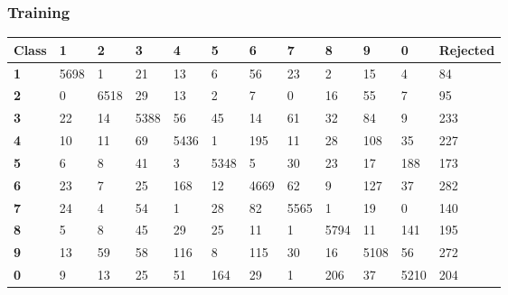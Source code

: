 \documentclass[
  a4paper,            %
  DIV=10,             %
  oneside,            %
  BCOR=5mm,           %
  parskip=half,       %
  numbers=noenddot,   %
  bibtotoc,           %
  listof=totoc,        %
  article
]{scrreprt}
\begin{document}
\subsubsection{Training}
\begin{center}
  \begin{tabular}{|p{1cm}|p{1cm}|p{1cm}|p{1cm}|p{1cm}|p{1cm}|p{1cm}|p{1cm}|p{1cm}|p{1cm}|p{1cm}|p{1.7cm}|}
    \hline
    \textbf{Class} & \textbf{1} & \textbf{2} & \textbf{3} & \textbf{4} & \textbf{5} & \textbf{6} & \textbf{7} & \textbf{8} & \textbf{9} & \textbf{0} & \textbf{Rejected} \\
    \hline
    \textbf{1} & 5698 & 1 & 21 & 13 & 6 & 56 & 23 & 2 & 15 & 4 & 84 \\
    \hline
    \textbf{2} & 0 & 6518 & 29 & 13 & 2 & 7 & 0 & 16 & 55 & 7 & 95 \\
    \hline
    \textbf{3} & 22 & 14 & 5388 & 56 & 45 & 14 & 61 & 32 & 84 & 9 & 233 \\
    \hline
    \textbf{4} & 10 & 11 & 69 & 5436 & 1 & 195 & 11 & 28 & 108 & 35 & 227 \\
    \hline
    \textbf{5} & 6 & 8 & 41 & 3 & 5348 & 5 & 30 & 23 & 17 & 188 & 173 \\
    \hline
    \textbf{6} & 23 & 7 & 25 & 168 & 12 & 4669 & 62 & 9 & 127 & 37 & 282 \\
    \hline
    \textbf{7} & 24 & 4 & 54 & 1 & 28 & 82 & 5565 & 1 & 19 & 0 & 140 \\
    \hline
    \textbf{8} & 5 & 8 & 45 & 29 & 25 & 11 & 1 & 5794 & 11 & 141 & 195 \\
    \hline
    \textbf{9} & 13 & 59 & 58 & 116 & 8 & 115 & 30 & 16 & 5108 & 56 & 272 \\
    \hline
    \textbf{0} & 9 & 13 & 25 & 51 & 164 & 29 & 1 & 206 & 37 & 5210 & 204 \\
    \hline
\end{tabular}
\end{center}
\end{document}
